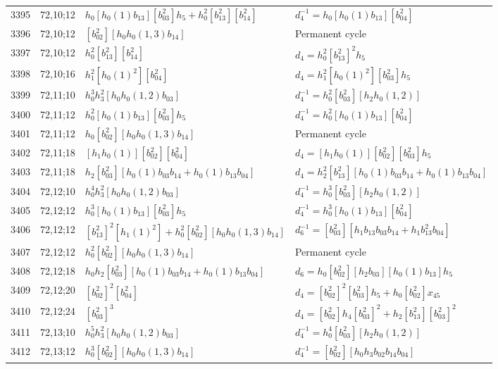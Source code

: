 \documentclass{article}
\begin{document}
\begin{longtable}{|l|l|>{\raggedright\arraybackslash}p{6cm}|>{\raggedright\arraybackslash}p{6cm}|}
\hline
3395 & 72,10;12 & $h_0[h_0(1)b_{13}][b_{03}^2]h_5 + h_0^2[b_{13}^2][b_{14}^2]$ & $d_{4}^{-1}=h_0[h_0(1)b_{13}][b_{04}^2]$\\
3396 & 72,10;12 & $[b_{02}^2][h_0h_0(1, 3)b_{14}]$ & Permanent cycle\\
3397 & 72,10;12 & $h_0^2[b_{13}^2][b_{14}^2]$ &$d_{4}=h_0^2[b_{13}^2]^2h_5$\\
\hline
3398 & 72,10;16 & $h_1^2[h_0(1)^2][b_{04}^2]$ &$d_{4}=h_1^2[h_0(1)^2][b_{03}^2]h_5$\\
\hline
3399 & 72,11;10 & $h_0^3h_3^2[h_0h_0(1, 2)b_{03}]$ & $d_{4}^{-1}=h_0^2[b_{03}^2][h_2h_0(1, 2)]$\\
\hline
3400 & 72,11;12 & $h_0^2[h_0(1)b_{13}][b_{03}^2]h_5$ & $d_{4}^{-1}=h_0^2[h_0(1)b_{13}][b_{04}^2]$\\
3401 & 72,11;12 & $h_0[b_{02}^2][h_0h_0(1, 3)b_{14}]$ & Permanent cycle\\
\hline
3402 & 72,11;18 & $[h_1h_0(1)][b_{02}^2][b_{04}^2]$ &$d_{4}=[h_1h_0(1)][b_{02}^2][b_{03}^2]h_5$\\
3403 & 72,11;18 & $h_2[b_{03}^2][h_0(1)b_{03}b_{14} + h_0(1)b_{13}b_{04}]$ &$d_{4}=h_2^2[b_{13}^2][h_0(1)b_{03}b_{14} + h_0(1)b_{13}b_{04}]$\\
\hline
3404 & 72,12;10 & $h_0^4h_3^2[h_0h_0(1, 2)b_{03}]$ & $d_{4}^{-1}=h_0^3[b_{03}^2][h_2h_0(1, 2)]$\\
\hline
3405 & 72,12;12 & $h_0^3[h_0(1)b_{13}][b_{03}^2]h_5$ & $d_{4}^{-1}=h_0^3[h_0(1)b_{13}][b_{04}^2]$\\
3406 & 72,12;12 & $[b_{13}^2]^2[h_1(1)^2] + h_0^2[b_{02}^2][h_0h_0(1, 3)b_{14}]$ & $d_{6}^{-1}=[b_{03}^2][h_1b_{13}b_{03}b_{14} + h_1b_{13}^2b_{04}]$\\
3407 & 72,12;12 & $h_0^2[b_{02}^2][h_0h_0(1, 3)b_{14}]$ & Permanent cycle\\
\hline
3408 & 72,12;18 & $h_0h_2[b_{03}^2][h_0(1)b_{03}b_{14} + h_0(1)b_{13}b_{04}]$ &$d_{6}=h_0[b_{02}^2][h_2b_{03}][h_0(1)b_{13}]h_5$\\
\hline
3409 & 72,12;20 & $[b_{02}^2]^2[b_{04}^2]$ &$d_{4}=[b_{02}^2]^2[b_{03}^2]h_5 + h_0[b_{02}^2]x_{45}$\\
\hline
3410 & 72,12;24 & $[b_{03}^2]^3$ &$d_{4}=[b_{02}^2]h_4[b_{03}^2]^2 + h_2[b_{13}^2][b_{03}^2]^2$\\
\hline
3411 & 72,13;10 & $h_0^5h_3^2[h_0h_0(1, 2)b_{03}]$ & $d_{4}^{-1}=h_0^4[b_{03}^2][h_2h_0(1, 2)]$\\
\hline
3412 & 72,13;12 & $h_0^3[b_{02}^2][h_0h_0(1, 3)b_{14}]$ & $d_{4}^{-1}=[b_{02}^2][h_0h_3b_{02}b_{14}b_{04}]$\\

\end{longtable}
\end{document}
